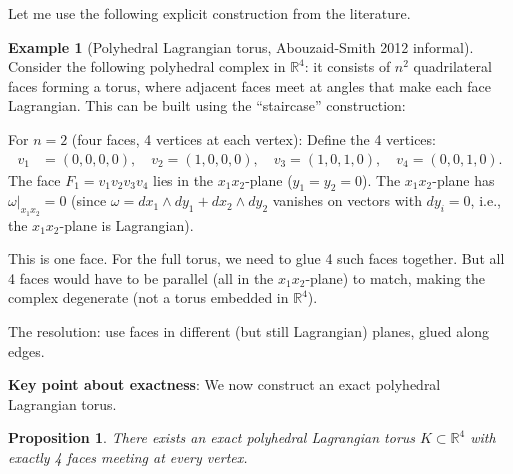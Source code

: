 \documentclass[12pt]{article}
\newtheorem{proposition}{Proposition}
\theoremstyle{definition}
\newtheorem{example}{Example}
\begin{document}
Let me use the following explicit construction from the literature.

\begin{example}[Polyhedral Lagrangian torus, Abouzaid-Smith 2012 informal]\label{ex:poly-lag-torus}
Consider the following polyhedral complex in $\mathbb{R}^4$: it consists of $n^2$ quadrilateral faces forming a torus, where adjacent faces meet at angles that make each face Lagrangian. This can be built using the ``staircase'' construction:

For $n = 2$ (four faces, 4 vertices at each vertex): Define the 4 vertices:
\begin{align*}
v_1 &= (0,0,0,0),\quad v_2 = (1,0,0,0), \quad v_3 = (1,0,1,0), \quad v_4 = (0,0,1,0).
\end{align*}
The face $F_1 = v_1v_2v_3v_4$ lies in the $x_1x_2$-plane ($y_1=y_2=0$). The $x_1x_2$-plane has $\omega|_{x_1x_2} = 0$ (since $\omega = dx_1\wedge dy_1 + dx_2\wedge dy_2$ vanishes on vectors with $dy_i = 0$, i.e., the $x_1x_2$-plane is Lagrangian).

This is one face. For the full torus, we need to glue 4 such faces together. But all 4 faces would have to be parallel (all in the $x_1x_2$-plane) to match, making the complex degenerate (not a torus embedded in $\mathbb{R}^4$).

The resolution: use faces in different (but still Lagrangian) planes, glued along edges.
\end{example}

\textbf{Key point about exactness}: We now construct an exact polyhedral Lagrangian torus.

\begin{proposition}\label{prop:exact-poly}
There exists an exact polyhedral Lagrangian torus $K\subset\mathbb{R}^4$ with exactly 4 faces meeting at every vertex.
\end{proposition}
\end{document}
